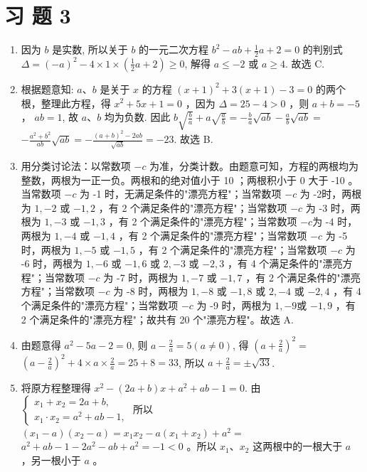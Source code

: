 \documentclass[10pt]{article}
\begin{document}
\section*{习 题 3}
\begin{enumerate}
  \item 因为 $b$ 是实数, 所以关于 $b$ 的一元二次方程 $b^{2}-a b+\frac{1}{2} a+2=0$ 的判别式 $\Delta=(-a)^{2}-4 \times 1 \times\left(\frac{1}{2} a+2\right) \geqslant 0$, 解得 $a \leqslant-2$ 或 $a \geqslant 4$. 故选 C.
  \item 根据题意知: $a 、 b$ 是关于 $x$ 的方程 $(x+1)^{2}+3(x+1)-3=0$ 的两个根，整理此方程，得 $x^{2}+5 x+1=0$ ，因为 $\Delta=25-4>0$ ，则 $a+b=-5$ ， $a b=1$, 故 $a 、 b$ 均为负数. 因此 $b \sqrt{\frac{b}{a}}+a \sqrt{\frac{a}{b}}=-\frac{b}{a} \sqrt{a b}-\frac{a}{b} \sqrt{a b}=$ $-\frac{a^{2}+b^{2}}{a b} \sqrt{a b}=-\frac{(a+b)^{2}-2 a b}{\sqrt{a b}}=-23$. 故选 B.
  \item 用分类讨论法：以常数项 $-c$ 为准，分类计数。由题意可知，方程的两根均为整数，两根为一正一负。两根和的绝对值小于 10 ；两根积小于 0 大于 -10 。当常数项 $-c$ 为 -1 时，无满足条件的"漂亮方程"；当常数项 $-c$ 为 -2时，两根为 $1,-2$ 或 $-1,2$ ，有 2 个满足条件的"漂亮方程"；当常数项 $-c$ 为 -3 时，两根为 $1,-3$ 或 $-1,3$ ，有 2 个满足条件的"漂亮方程"；当常数项 $-c$为 -4 时，两根为 $1,-4$ 或 $-1,4$ ，有 2 个满足条件的"漂亮方程"；当常数项 $-c$ 为 -5 时，两根为 $1,-5$ 或 $-1,5$ ，有 2 个满足条件的"漂亮方程"；当常数项 $-c$ 为 -6 时，两根为 $1,-6$ 或 $-1,6$ 或 $2,-3$ 或 $-2,3$ ，有 4 个满足条件的"漂亮方程"；当常数项 $-c$ 为 -7 时，两根为 $1,-7$ 或 $-1,7$ ，有 2 个满足条件的"漂亮方程"；当常数项 $-c$ 为 -8 时，两根为 $1,-8$ 或 $-1,8$ 或 $2,-4$ 或 $-2,4$ ，有 4 个满足条件的"漂亮方程"；当常数项 $-c$ 为 -9 时，两根为 $1,-9$或 $-1,9$ ，有 2 个满足条件的"漂亮方程"；故共有 20 个"漂亮方程"。故选 A.
  \item 由题意得 $a^{2}-5 a-2=0$, 则 $a-\frac{2}{a}=5(a \neq 0)$, 得 $\left(a+\frac{2}{a}\right)^{2}=$ $\left(a-\frac{2}{a}\right)^{2}+4 \times a \times \frac{2}{a}=25+8=33$, 所以 $a+\frac{2}{a}= \pm \sqrt{33}$.
  \item 将原方程整理得 $x^{2}-(2 a+b) x+a^{2}+a b-1=0$. 由 $\left\{\begin{array}{l}x_{1}+x_{2}=2 a+b, \\ x_{1} \cdot x_{2}=a^{2}+a b-1,\end{array}\right.$ 所以 $\left(x_{1}-a\right)\left(x_{2}-a\right)=x_{1} x_{2}-a\left(x_{1}+x_{2}\right)+a^{2}=$ $a^{2}+a b-1-2 a^{2}-a b+a^{2}=-1<0$ 。所以 $x_{1} 、 x_{2}$ 这两根中的一根大于 $a$ ，另一根小于 $a$ 。

\end{enumerate}
\end{document}
